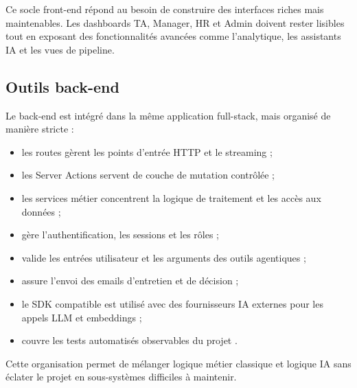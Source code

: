 Ce socle front-end répond au besoin de construire des interfaces riches mais maintenables. Les dashboards TA, Manager, HR et Admin doivent rester lisibles tout en exposant des fonctionnalités avancées comme l'analytique, les assistants IA et les vues de pipeline.

\subsection{Outils back-end}
Le back-end est intégré dans la même application full-stack, mais organisé de manière stricte :
\begin{itemize}
  \item les routes  gèrent les points d'entrée HTTP et le streaming  ;
  \item les Server Actions servent de couche de mutation contrôlée ;
  \item les services métier concentrent la logique de traitement et les accès aux données ;
  \item {} gère l'authentification, les sessions et les rôles  ;
  \item {} valide les entrées utilisateur et les arguments des outils agentiques  ;
  \item {} assure l'envoi des emails d'entretien et de décision ;
  \item le SDK compatible  est utilisé avec des fournisseurs IA externes pour les appels LLM et embeddings ;
  \item {} couvre les tests automatisés observables du projet .
\end{itemize}

Cette organisation permet de mélanger logique métier classique et logique IA sans éclater le projet en sous-systèmes difficiles à maintenir.

